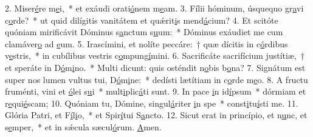 2. Miser\uline{é}re m\uline{e}i,~* et exáudi orati\uline{ó}nem m\uline{e}am.
3. Fílii hóminum, úsquequo gr\uline{a}vi c\uline{o}rde?~* ut quid dilígitis vanitátem et quǽrit\uline{i}s mend\uline{á}cium?
4. Et scitóte quóniam mirificávit Dóminus s\uline{a}nctum s\uline{u}um:~* Dóminus exáudiet me cum clamáver\uline{o} ad \uline{e}um.
5. Irascímini, et nolíte peccáre:~† quæ dícitis in c\uline{ó}rdibus v\uline{e}stris,~* in cubílibus vestris c\uline{o}mpung\uline{í}mini.
6. Sacrificáte sacrifícium justítiæ,~† et speráte in D\uline{ó}m\uline{i}no.~* Multi dicunt: quis osténdit n\uline{o}bis b\uline{o}na?
7. Signátum est super nos lumen vultus tui, D\uline{ó}m\uline{i}ne:~* dedísti lætítiam in c\uline{o}rde m\uline{e}o.
8. A fructu fruménti, vini et \uline{ó}lei s\uline{u}i~* mult\uline{i}plic\uline{á}ti sunt.
9. In pace \uline{i}n id\uline{í}psum~* dórmiam et r\uline{e}qui\uline{é}scam;
10. Quóniam tu, Dómine, singul\uline{á}riter \uline{i}n spe~* const\uline{i}tu\uline{í}sti me.
11. Glória Patri, et F\uline{í}l\uline{i}o,~* et Spir\uline{í}tui S\uline{a}ncto.
12. Sicut erat in princípio, et n\uline{u}nc, et s\uline{e}mper,~* et in sǽcula sæcul\uline{ó}rum. \uline{A}men.
